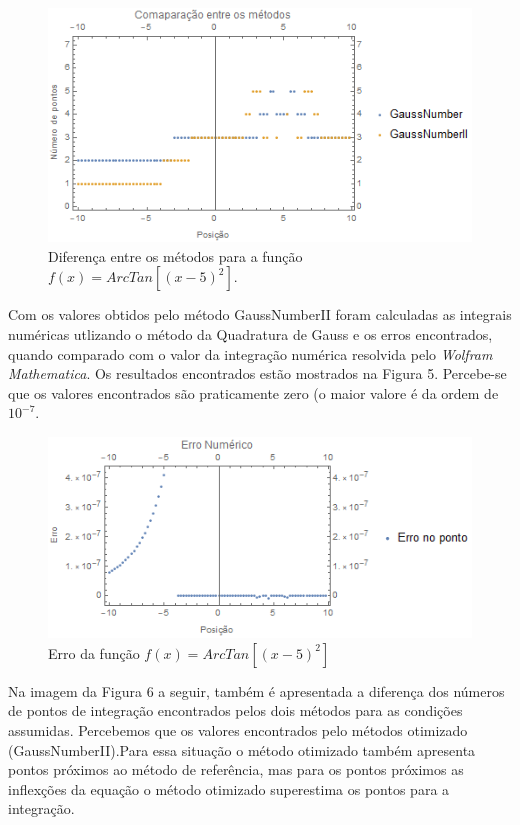 \documentclass[12pt,a4paper]{article}
\begin{document}
\begin{figure}[H]
\begin{center}
\includegraphics{images/comparacao_arctang}
\caption{Diferença entre os métodos para a função $f(x)=ArcTan[(x-5)^{2}]$.}
\end{center}
\end{figure}

\newpage
\quad Com os valores obtidos pelo método GaussNumberII foram calculadas as integrais numéricas utlizando o método da Quadratura de Gauss e os erros encontrados, quando comparado com o valor da integração numérica resolvida pelo \textit{Wolfram Mathematica}. Os resultados encontrados estão mostrados na Figura 5. Percebe-se que os valores encontrados são praticamente zero (o maior valore é da ordem de $10^{-7}$.

\begin{figure}[H]
\begin{center}
\includegraphics{images/erro_arctang}
\caption{Erro da função $f(x)=ArcTan[(x-5)^{2}]$}
\end{center}
\end{figure}

\newpage

\qquad Na imagem da Figura 6 a seguir, também é apresentada a diferença dos números de pontos de integração encontrados pelos dois métodos para as condições assumidas. Percebemos que os valores encontrados pelo métodos otimizado (GaussNumberII).Para essa situação o método otimizado também apresenta pontos próximos ao método de referência, mas para os pontos próximos as inflexções da equação o método otimizado superestima os pontos para a integração.
\end{document}
